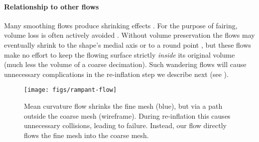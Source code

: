 
\paragraph{Relationship to other flows}
%
Many smoothing flows produce shrinking effects
\cite{Taubin:1995,desbrun99implicitfairing,Crane:2013:RFV}. For the purpose of
fairing, volume loss is often actively avoided \cite{desbrun99implicitfairing}.
%
Without volume preservation the flows may eventually shrink to the shape's
medial axis \cite{Au:2008,Tagliasacchi:2012:MCS} or to a round point
\cite{Kazhdan:2012}, but these flows make no effort to keep the flowing surface
strictly \emph{inside} its original volume (much less the volume of a coarse decimation). Such
wandering flows will cause unnecessary complications in the re-inflation step
we describe next (see ).

\begin{figure*}
  \texttt{[image: figs/rampant-flow]}
  \caption{Mean curvature flow \protect\cite{Kazhdan2012} shrinks the fine mesh
  (blue), but via a path outside the coarse mesh (wireframe).  During
  re-inflation this causes unnecessary collisions, leading to failure.
  Instead, our flow directly flows the fine mesh into the coarse mesh.}
  \label{fig:rampant-flow}
\end{figure*}



